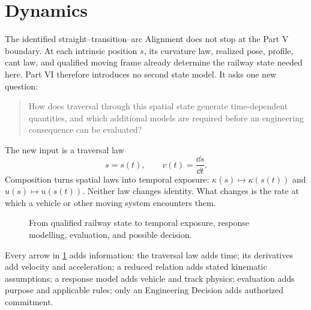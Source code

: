 
\chapter*{Dynamics}
{}

The identified straight--transition--arc Alignment does not stop at the Part V
boundary. At each intrinsic position \(s\), its curvature law, realized pose,
profile, cant law, and qualified moving frame already determine the railway
state needed here. Part VI therefore introduces no second state model. It asks
one new question:

\begin{quote}
How does traversal through this spatial state generate time-dependent
quantities, and which additional models are required before an engineering
consequence can be evaluated?
\end{quote}

The new input is a traversal law
\[
s=s(t),\qquad v(t)=\frac{\dd s}{\dd t}.
\]
Composition turns spatial laws into temporal exposure:
\(\kappa(s)\mapsto\kappa(s(t))\) and \(u(s)\mapsto u(s(t))\).
Neither law changes identity. What changes is the rate at which a vehicle or
other moving system encounters them.

\begin{figure}[htbp]
\centering

\caption{From qualified railway state to temporal exposure, response modelling, evaluation, and possible decision.}
\label{fig:space-to-time-dependency}
\end{figure}

Every arrow in \cref{fig:space-to-time-dependency} adds information:
the traversal law adds time; its derivatives add velocity and acceleration;
a reduced relation adds stated kinematic assumptions; a response model adds
vehicle and track physics; evaluation adds purpose and applicable rules; only
an Engineering Decision adds authorized commitment.

